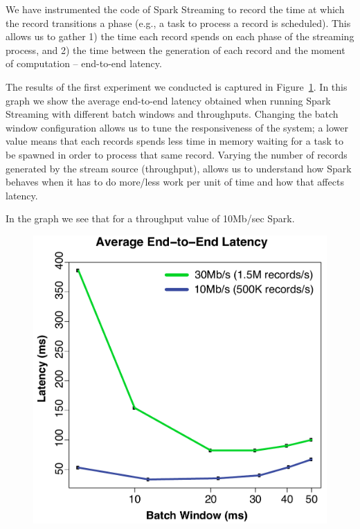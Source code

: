 We have instrumented the code of Spark Streaming to record the time at which the record transitions a phase (e.g., a task to process a record is scheduled).
This allows us to gather 1) the time each record spends on each phase of the streaming process, 
and 2) the time between the generation of each record and the moment of computation -- end-to-end latency.



The results of the first experiment we conducted is captured in Figure~\ref{fig:Batchsize_vs_latency}.
In this graph we show the average end-to-end latency obtained when running Spark Streaming with different batch windows and throughputs. 
Changing the batch window configuration allows us to tune the responsiveness of the system; a lower value means that each records spends less time in memory waiting for a task
to be spawned in order to process that same record. 
Varying the number of records generated by the stream source (throughput), allows us to understand how 
Spark behaves when it has to do more/less work per unit of time and how that affects latency.

In the graph we see that for a throughput value of 10Mb/sec Spark.


\begin{figure}[t!]
  \begin{center}
    \includegraphics[scale=0.30]{images_graphs/batchsize_vs_latency/batchsize_vs_latency3.pdf}
  \end{center}
  \caption{}
  \label{fig:Batchsize_vs_latency}
\end{figure}


